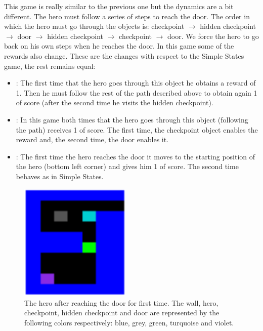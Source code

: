 This game is really similar to the previous one but the dynamics are a bit different.
The hero must follow a series of steps to reach the door.
The order in which the hero must go through the objects is: checkpoint $\rightarrow$ hidden checkpoint $\rightarrow$
door $\rightarrow$ hidden checkpoint $\rightarrow$ checkpoint $\rightarrow$ door.
We force the hero to go back on his own steps when he reaches the door.
In this game some of the rewards also change.
These are the changes with respect to the Simple States game, the rest remains equal:
\begin{itemize}
    \item {}: The first time that the hero goes through this object he obtains a reward of 1.
    Then he must follow the rest of the path described above to obtain again 1 of score (after the second time he visits the hidden checkpoint).
    \item {}: In this game both times that the hero goes through this object
    (following the path) receives 1 of score.
    The first time, the checkpoint object enables the reward and, the second time, the door enables it.
    \item {}: The first time the hero reaches the door it moves to the starting position of the hero (bottom left corner)
    and gives him 1 of score.
    The second time behaves as in Simple States.
\end{itemize}

\begin{figure}[hbtp]
\begin{center}
\includegraphics[width=200]{img/ComplexStates_going_back.png}
\end{center}
\caption[Complex States game]
{The hero after reaching the door for first time. The wall, hero, checkpoint, hidden checkpoint
and door are represented by the following colors respectively: blue, grey, green, turquoise and violet.}
\label{fig:ComplexStates}
\end{figure}


